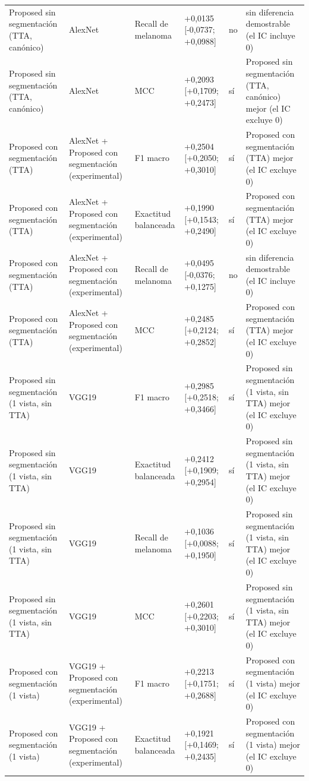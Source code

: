 \begin{longtable}{@{}llllll@{}}
Proposed sin segmentación (TTA, canónico) & AlexNet & Recall de melanoma & +0,0135 [-0,0737; +0,0988] & no & sin diferencia demostrable (el IC incluye 0) \\
Proposed sin segmentación (TTA, canónico) & AlexNet & MCC & +0,2093 [+0,1709; +0,2473] & sí & Proposed sin segmentación (TTA, canónico) mejor (el IC excluye 0) \\
Proposed con segmentación (TTA) & AlexNet + Proposed con segmentación (experimental) & F1 macro & +0,2504 [+0,2050; +0,3010] & sí & Proposed con segmentación (TTA) mejor (el IC excluye 0) \\
Proposed con segmentación (TTA) & AlexNet + Proposed con segmentación (experimental) & Exactitud balanceada & +0,1990 [+0,1543; +0,2490] & sí & Proposed con segmentación (TTA) mejor (el IC excluye 0) \\
Proposed con segmentación (TTA) & AlexNet + Proposed con segmentación (experimental) & Recall de melanoma & +0,0495 [-0,0376; +0,1275] & no & sin diferencia demostrable (el IC incluye 0) \\
Proposed con segmentación (TTA) & AlexNet + Proposed con segmentación (experimental) & MCC & +0,2485 [+0,2124; +0,2852] & sí & Proposed con segmentación (TTA) mejor (el IC excluye 0) \\
Proposed sin segmentación (1 vista, sin TTA) & VGG19 & F1 macro & +0,2985 [+0,2518; +0,3466] & sí & Proposed sin segmentación (1 vista, sin TTA) mejor (el IC excluye 0) \\
Proposed sin segmentación (1 vista, sin TTA) & VGG19 & Exactitud balanceada & +0,2412 [+0,1909; +0,2954] & sí & Proposed sin segmentación (1 vista, sin TTA) mejor (el IC excluye 0) \\
Proposed sin segmentación (1 vista, sin TTA) & VGG19 & Recall de melanoma & +0,1036 [+0,0088; +0,1950] & sí & Proposed sin segmentación (1 vista, sin TTA) mejor (el IC excluye 0) \\
Proposed sin segmentación (1 vista, sin TTA) & VGG19 & MCC & +0,2601 [+0,2203; +0,3010] & sí & Proposed sin segmentación (1 vista, sin TTA) mejor (el IC excluye 0) \\
Proposed con segmentación (1 vista) & VGG19 + Proposed con segmentación (experimental) & F1 macro & +0,2213 [+0,1751; +0,2688] & sí & Proposed con segmentación (1 vista) mejor (el IC excluye 0) \\
Proposed con segmentación (1 vista) & VGG19 + Proposed con segmentación (experimental) & Exactitud balanceada & +0,1921 [+0,1469; +0,2435] & sí & Proposed con segmentación (1 vista) mejor (el IC excluye 0) \\

\end{longtable}
